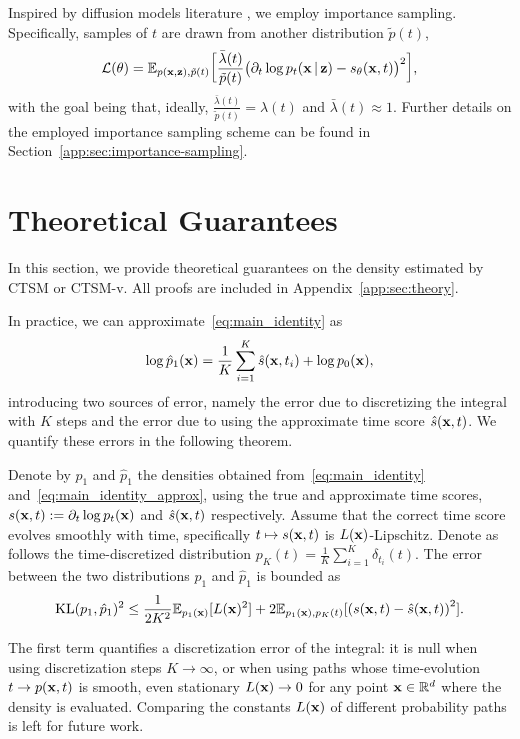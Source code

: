 Inspired by diffusion models literature \citep{Song2021mle}, we employ importance sampling. Specifically, samples of $t$ are drawn from another distribution $\tilde{p}(t)$,
\begin{equation}
\mathcal{L}(\operatorname{\mathbf{\theta}}) 
= 
\mathbb{E}_{p(\operatorname{\mathbf{x}}, \operatorname{\mathbf{z}}), \tilde{p}(t)} \bigg[
\frac{\bar{\lambda}(t)}{\tilde{p}(t)} \big( \partial_{t}\log p_{t}(\operatorname{\mathbf{x}}|\operatorname{\mathbf{z}}) - s_{\operatorname{\mathbf{\theta}}}(\operatorname{\mathbf{x}}, t) \big)^2 
\bigg],
\end{equation}
with the goal being that, ideally, $\frac{\bar{\lambda}(t)}{\tilde{p}(t)} = \lambda(t)$ and $\bar{\lambda}(t) \approx 1$. Further details on the employed importance sampling scheme can be found in Section~\ref{app:sec:importance-sampling}.

\section{Theoretical Guarantees}
\label{sec:theoretical_guarantees}

In this section, we provide theoretical guarantees on the density estimated by CTSM or CTSM-v. All proofs are included in Appendix~\ref{app:sec:theory}. 

In practice, we can approximate~\eqref{eq:main_identity} as
\begin{align}
    \label{eq:main_identity_approx}
    \log \hat{p}_1(\operatorname{\mathbf{x}})
    = 
    \frac{1}{K} \sum_{i=1}^K \hat{s}(\operatorname{\mathbf{x}}, t_i)
    + 
    \log p_0(\operatorname{\mathbf{x}}),
\end{align}
introducing two sources of error, namely the error due to discretizing the integral with $K$ steps and the error due to using the approximate time score $\hat{s}(\operatorname{\mathbf{x}}, t)$. We quantify these errors in the following theorem.
\begin{theorem}
\label{theorem:error_bound}
Denote by $p_1$ and $\hat{p}_1$ the densities obtained from~\eqref{eq:main_identity} and~\eqref{eq:main_identity_approx}, using the true and approximate time scores, $s(\operatorname{\mathbf{x}}, t):=\partial_t \log p_t(\operatorname{\mathbf{x}})$ and $\hat{s}(\operatorname{\mathbf{x}}, t)$ respectively. 
Assume that the correct time score evolves smoothly with time, specifically $t \mapsto s(\operatorname{\mathbf{x}}, t)$ is $L(\operatorname{\mathbf{x}})$-Lipschitz. Denote as follows the time-discretized distribution $p_K(t) = \frac{1}{K} \sum_{i=1}^K \delta_{t_i}(t)$. The error between the two distributions $p_1$ and $\hat{p}_1$ is bounded as
\begin{align}
\label{eq:generic_error_bound}
    \mathrm{KL}(p_1, \hat{p}_1)^2
    \leq
    \frac{1}{2 K^2}
    \mathbb{E}_{p_1(\operatorname{\mathbf{x}})} [L(\operatorname{\mathbf{x}})^2]
    +
    2
    \mathbb{E}_{p_1(\operatorname{\mathbf{x}}), p_K(t)}
    [
    \left( s(\operatorname{\mathbf{x}}, t) - \hat{s}(\operatorname{\mathbf{x}}, t) \right)^2
    ].
\end{align}
\end{theorem}
The first term quantifies a discretization error of the integral: it is null when using discretization steps $K \rightarrow \infty$, or when using paths whose time-evolution $t \rightarrow p(\operatorname{\mathbf{x}}, t)$ is smooth, even stationary $L(\operatorname{\mathbf{x}}) \rightarrow 0$ for any point $\operatorname{\mathbf{x}} \in \mathbb{R}^d$ where the density is evaluated. Comparing the constants $L(\operatorname{\mathbf{x}})$ of different probability paths is left for future work. 

